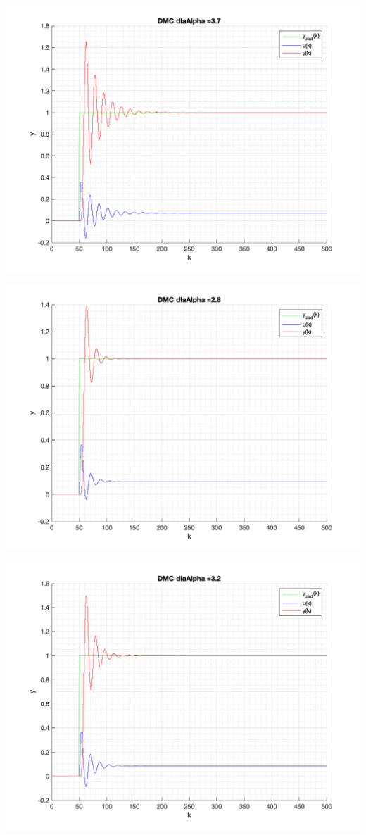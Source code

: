 \documentclass[a4paper, 11pt]{article}
\begin{document}
\begin{enumerate}
 \includegraphics[width=\linewidth]{./ModelsDodatkowe_Alpha/P4_DMC_Alpha_3_7_png.png} 
 
 \includegraphics[width=\linewidth]{./ModelsDodatkowe_Alpha/P4_DMC_Alpha_2_8_png.png} 
 
 \includegraphics[width=\linewidth]{./ModelsDodatkowe_Alpha/P4_DMC_Alpha_3_2_png.png} 
 

\end{enumerate}
\end{document}
